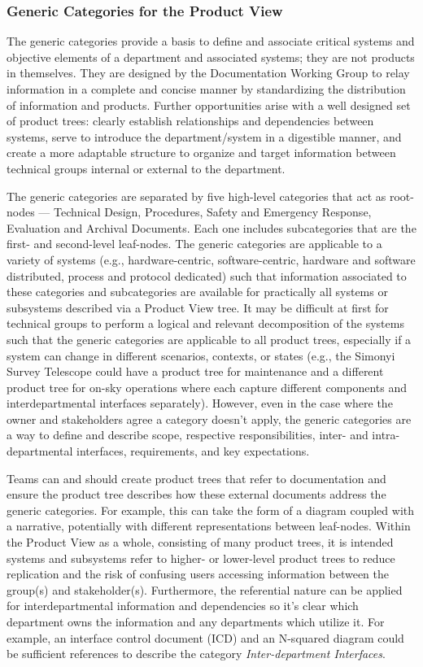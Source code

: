 \subsubsection{Generic Categories for the Product View}

The generic categories provide a basis to define and associate critical systems and objective elements of a department and associated systems; they are not products in themselves.
They are designed by the Documentation Working Group to relay information in a complete and concise manner by standardizing the distribution of information and products.
Further opportunities arise with a well designed set of product trees: clearly establish relationships and dependencies between systems, serve to introduce the department/system in a digestible manner, and create a more adaptable structure to organize and target information between technical groups internal or external to the department.

The generic categories are separated by five high-level categories that act as root-nodes --- Technical Design, Procedures, Safety and Emergency Response, Evaluation and Archival Documents.
Each one includes subcategories that are the first- and second-level leaf-nodes.
The generic categories are applicable to a variety of systems (e.g., hardware-centric, software-centric, hardware and software distributed, process and protocol dedicated) such that information associated to these categories and subcategories are available for practically all systems or subsystems described via a Product View tree.
It may be difficult at first for technical groups to perform a logical and relevant decomposition of the systems such that the generic categories are applicable to all product trees, especially if a system can change in different scenarios, contexts, or states (e.g., the Simonyi Survey Telescope could have a product tree for maintenance and a different product tree for on-sky operations where each capture different components and interdepartmental interfaces separately).
However, even in the case where the owner and stakeholders agree a category doesn't apply, the generic categories are a way to define and describe scope, respective responsibilities, inter- and intra-departmental interfaces, requirements, and key expectations.

Teams can and should create product trees that refer to documentation and ensure the product tree describes how these external documents address the generic categories.
For example, this can take the form of a diagram coupled with a narrative, potentially with different representations between leaf-nodes.
Within the Product View as a whole, consisting of many product trees, it is intended systems and subsystems refer to higher- or lower-level product trees to reduce replication and the risk of confusing users accessing information between the group(s) and stakeholder(s).
Furthermore, the referential nature can be applied for interdepartmental information and dependencies so it's clear which department owns the information and any departments which utilize it.
For example, an interface control document (ICD) and an N-squared diagram could be sufficient references to describe the category \textit{Inter-department Interfaces}.

